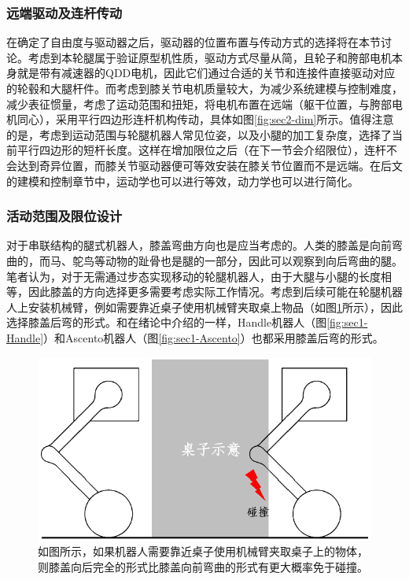 \subsubsection{远端驱动及连杆传动}
在确定了自由度与驱动器之后，驱动器的位置布置与传动方式的选择将在本节讨论。考虑到本轮腿属于验证原型机性质，驱动方式尽量从简，且轮子和胯部电机本身就是带有减速器的QDD电机，因此它们通过合适的关节和连接件直接驱动对应的轮毂和大腿杆件。而考虑到膝关节电机质量较大，为减少系统建模与控制难度，减少表征惯量，考虑了运动范围和扭矩，将电机布置在远端（躯干位置，与胯部电机同心），采用平行四边形连杆机构传动，具体如图\ref{fig:sec2-dim}所示。值得注意的是，考虑到运动范围与轮腿机器人常见位姿，以及小腿的加工复杂度，选择了当前平行四边形的短杆长度。这样在增加限位之后（在下一节会介绍限位），连杆不会达到奇异位置，而膝关节驱动器便可等效安装在膝关节位置而不是远端。在后文的建模和控制章节中，运动学也可以进行等效，动力学也可以进行简化。

\subsubsection{活动范围及限位设计}
对于串联结构的腿式机器人，膝盖弯曲方向也是应当考虑的。人类的膝盖是向前弯曲的，而马、鸵鸟等动物的趾骨也是腿的一部分，因此可以观察到向后弯曲的腿。笔者认为，对于无需通过步态实现移动的轮腿机器人，由于大腿与小腿的长度相等，因此膝盖的方向选择更多需要考虑实际工作情况。考虑到后续可能在轮腿机器人上安装机械臂，例如需要靠近桌子使用机械臂夹取桌上物品（如图\ref{fig:sec2-table}所示），因此选择膝盖后弯的形式。和在绪论中介绍的一样，Handle机器人（图\ref{fig:sec1-Handle}）和Ascento机器人（图\ref{fig:sec1-Ascento}）也都采用膝盖后弯的形式。

\begin{figure}[h!]
  \centering
  \includegraphics[width=0.75\linewidth]{figures/Sec2/table.png}
  \caption{
  如图所示，如果机器人需要靠近桌子使用机械臂夹取桌子上的物体，则膝盖向后完全的形式比膝盖向前弯曲的形式有更大概率免于碰撞。
  }
  \label{fig:sec2-table}
   \vspace{5pt}
\end{figure}

